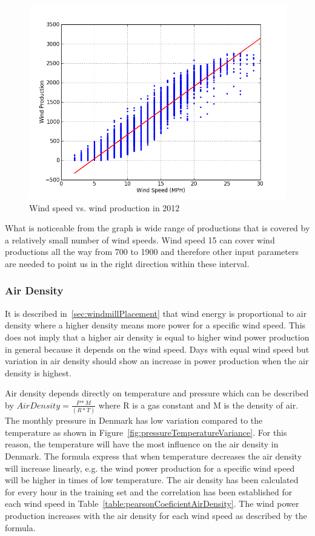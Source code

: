 \begin{figure}[H]
\centering
\includegraphics[width=0.99\linewidth,natwidth=898,natheight=587]{billeder/WindSpeedVsProduction.png}
\caption{Wind speed vs. wind production in 2012}
\label{fig:windVsProd}
\end{figure}

What is noticeable from the graph is wide range of productions that is covered by a relatively small number of wind speeds. Wind speed 15 can cover wind productions all the way from 700 to 1900 and therefore other input parameters are needed to point us in the right direction within these interval. 

\subsubsection{Air Density}
\label{sec:airDensity}
It is described in~\ref{sec:windmillPlacement} that wind energy is proportional to air density where a higher density means more power for a specific wind speed. This does not imply that a higher air density is equal to higher wind power production in general because it depends on the wind speed. Days with equal wind speed but variation in air density should show an increase in power production when the air density is highest. 

Air density depends directly on temperature and pressure which can be described by $Air Density=\frac{P*M}{(R*T)}$ where R is a gas constant and M is the density of air. The monthly pressure in Denmark has low variation compared to the temperature as shown in Figure~\ref{fig:pressureTemperatureVariance}. For this reason, the temperature will have the most influence on the air density in Denmark. The formula express that when temperature decreases the air density will increase linearly, e.g. the wind power production for a specific wind speed will be higher in times of low temperature. The air density has been calculated for every hour in the training set and the correlation has been established for each wind speed in Table~\ref{table:pearsonCoeficientAirDensity}. The wind power production increases with the air density for each wind speed as described by the formula.

